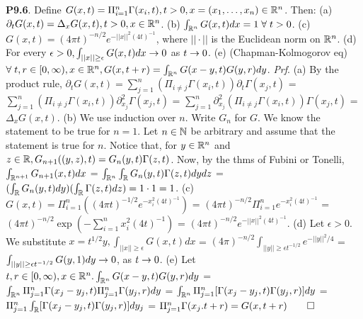 {\bf P9.6}. Define $G(x,t) = \Pi_{i=1}^n \Gamma(x_i, t), t >0, x = (x_1, \dots, x_n) \in \mathbb{R}^n$. Then: (a) $\partial_t G(x,t) = \Delta_x G(x,t), t > 0, x \in \mathbb{R}^n$.  (b) $\int_{\mathbb{R}^n} G(x,t) dx = 1\; \forall \; t > 0$. (c) $G(x,t) = (4 \pi t)^{-n/2} e^{-||x||^2(4t)^{-1}}$, where $|| \cdot ||$ is the Euclidean norm on $\mathbb{R}^n$. (d) For every $\epsilon > 0, \int_{||x|| \geq \epsilon} G(x,t) dx \rightarrow 0$ as $t \rightarrow 0$. (e) (Chapman-Kolmogorov eq) $\forall \; t,r \in [0, \infty), x \in \mathbb{R}^n, G(x,t+r) = \int_{\mathbb{R}^n} G(x-y, t) G(y,r)dy$. {\it Prf}. (a) By the product rule, $\partial_t G(x,t) = \sum_{j=1}^n ( \Pi_{i \neq j} \Gamma (x_i, t))\partial_t \Gamma(x_j,t)$ = $\sum_{j=1}^n ( \Pi_{i \neq j} \Gamma (x_i, t))\partial_{x_j}^2 \Gamma(x_j,t)$ = $ \sum_{j=1}^n \partial_{x_j}^2 ( \Pi_{i \neq j} \Gamma (x_i, t))\Gamma(x_j,t)$  = $\Delta_x G(x,t)$. (b) We use induction over $n$. Write $G_n$ for $G$. We know the statement to be true for $n =1$. Let $n \in \mathbb{N}$ be arbitrary and assume that the statement is true for $n$. Notice that, for $y \in \mathbb{R}^n$ and $z \in \mathbb{R}, G_{n+1}((y,z),t) = G_n(y,t)\Gamma(z,t)$. Now, by the thms of Fubini or Tonelli, $\int_{\mathbb{R}^{n+1}} G_{n+1}(x, t) dx$ = $ \int_{\mathbb{R}^n} \int_{\mathbb{R}} G_n (y, t) \Gamma (z, t) dy dz$ = $( \int_{\mathbb{R}} G_n (y, t) dy)(\int_{\mathbb{R}} \Gamma (z, t) dz) = 1 \cdot 1 = 1$. (c) $G(x, t) = \Pi_{i=1}^n ((4 \pi t)^{-1/2} e^{-x_i^2(4t)^{-1}})$ = $(4 \pi t)^{-n/2} \Pi_{i=1}^n e^{-x_i^2(4t)^{-1}}$ = $(4 \pi t)^{-n/2} \exp ( - \sum_{i=1}^n x_i^2 (4t)^{-1})$ = $(4 \pi t)^{-n/2} e^{-||x||^2(4t)^{-1}}$. (d) Let $\epsilon > 0$. We substitute $x = t^{1/2}y, \int_{||x||\geq \epsilon} G(x,t)dx$ = $(4 \pi )^{-n/2} \int_{||y||\geq \epsilon t^{-1/2}} e^{-||y||^2 /4}$ = $\int_{||y||\geq \epsilon t^{-1/2}} G(y,1) dy \rightarrow 0$, as $t \rightarrow 0$. (e) Let $t, r \in [0, \infty), x \in \mathbb{R}^n. \int_{\mathbb{R}^n} G(x-y, t) G(y,r) dy$ = $ \int_{\mathbb{R}^n} \Pi_{j=1}^n \Gamma(x_j - y_j, t) \Pi_{j=1}^n \Gamma(y_j, r) dy$ = $\int_{\mathbb{R}^n} \Pi_{j=1}^n [\Gamma(x_j - y_j, t)  \Gamma(y_j, r) ]dy$ = $  \Pi_{j=1}^n \int_{\mathbb{R}} [\Gamma(x_j - y_j, t)  \Gamma(y_j, r) ]dy_j$ = $ \Pi_{j=1}^n \Gamma(x_j. t+r) = G(x,t+r) \qed$